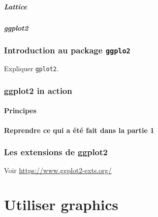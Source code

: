 \documentclass[]{article}
\begin{document}
\hypertarget{lattice}{%
\subsubsection{Lattice}\label{lattice}}

\hypertarget{ggplot2}{%
\subsubsection{ggplot2}\label{ggplot2}}

\hypertarget{introduction-au-package-ggplo2}{%
\section{\texorpdfstring{Introduction au package \texttt{ggplo2}}{Introduction au package ggplo2}}\label{introduction-au-package-ggplo2}}

Expliquer \texttt{gplot2}.

\hypertarget{ggplot2-in-action}{%
\section{ggplot2 in action}\label{ggplot2-in-action}}

\hypertarget{principes-1}{%
\subsection{Principes}\label{principes-1}}

\hypertarget{reprendre-ce-qui-a-uxe9tuxe9-fait-dans-la-partie-1}{%
\subsection{Reprendre ce qui a été fait dans la partie 1}\label{reprendre-ce-qui-a-uxe9tuxe9-fait-dans-la-partie-1}}

\hypertarget{les-extensions-de-ggplot2}{%
\section{Les extensions de ggplot2}\label{les-extensions-de-ggplot2}}

Voir \url{https://www.ggplot2-exts.org/}

\hypertarget{part-utiliser-graphics-1}{%
\part{Utiliser graphics}\label{part-utiliser-graphics-1}}
\end{document}
